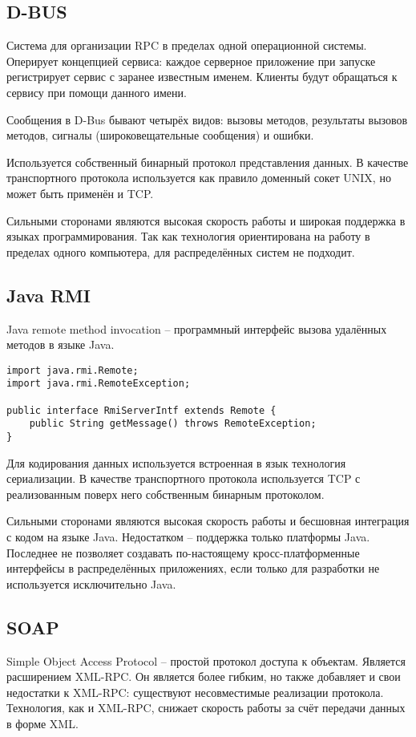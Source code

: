 \subsection{D-BUS}
Система для организации RPC в пределах одной операционной системы.
Оперирует концепцией сервиса: каждое серверное приложение при запуске
регистрирует сервис с заранее известным именем. Клиенты будут обращаться
к сервису при помощи данного имени.

Сообщения в D-Bus бывают четырёх видов: вызовы методов, результаты вызовов методов, сигналы (широковещательные сообщения) и ошибки.

Используется собственный бинарный протокол представления данных.
В качестве транспортного протокола используется как правило доменный сокет UNIX,
но может быть применён и TCP.

Сильными сторонами являются высокая скорость работы и широкая поддержка
в языках программирования. Так как технология ориентирована на работу
в пределах одного компьютера, для распределённых систем не подходит.

\subsection{Java RMI}
Java remote method invocation -- программный интерфейс вызова удалённых методов
в языке Java.
\begin{verbatim}
import java.rmi.Remote;
import java.rmi.RemoteException;

public interface RmiServerIntf extends Remote {
    public String getMessage() throws RemoteException;
}
\end{verbatim}

Для кодирования данных используется встроенная в язык технология сериализации.
В качестве транспортного протокола используется TCP с реализованным
поверх него собственным бинарным протоколом.

Сильными сторонами являются высокая скорость работы и бесшовная интеграция
с кодом на языке Java. Недостатком -- поддержка только платформы Java.
Последнее не позволяет создавать по-настоящему кросс-платформенные интерфейсы
в распределённых приложениях, если только для разработки не используется
исключительно Java.

\subsection{SOAP}
Simple Object Access Protocol -- простой протокол доступа к объектам.
Является расширением XML-RPC. Он является более гибким, но также добавляет
и свои недостатки к XML-RPC: существуют несовместимые реализации протокола.
Технология, как и XML-RPC, снижает скорость работы за счёт передачи данных
в форме XML.

